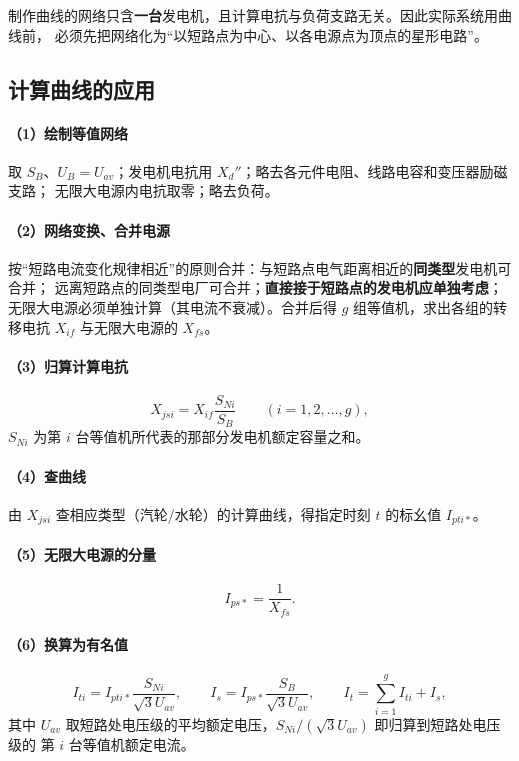 制作曲线的网络只含\textbf{一台}发电机，且计算电抗与负荷支路无关。因此实际系统用曲线前，
必须先把网络化为“以短路点为中心、以各电源点为顶点的星形电路”。

\subsection{计算曲线的应用}

\paragraph{（1）绘制等值网络}
取 $S_B$、$U_B=U_{av}$；发电机电抗用 $X_d''$；略去各元件电阻、线路电容和变压器励磁支路；
无限大电源内电抗取零；略去负荷。

\paragraph{（2）网络变换、合并电源}
按“短路电流变化规律相近”的原则合并：与短路点电气距离相近的\textbf{同类型}发电机可合并；
远离短路点的同类型电厂可合并；\textbf{直接接于短路点的发电机应单独考虑}；
无限大电源必须单独计算（其电流不衰减）。合并后得 $g$ 组等值机，求出各组的转移电抗
$X_{if}$ 与无限大电源的 $X_{fs}$。

\paragraph{（3）归算计算电抗}
\begin{equation}
  X_{jsi}=X_{if}\frac{S_{Ni}}{S_B}\qquad(i=1,2,\dots,g),
\end{equation}
$S_{Ni}$ 为第 $i$ 台等值机所代表的那部分发电机额定容量之和。

\paragraph{（4）查曲线}
由 $X_{jsi}$ 查相应类型（汽轮/水轮）的计算曲线，得指定时刻 $t$ 的标幺值 $I_{pti*}$。

\paragraph{（5）无限大电源的分量}
\begin{equation}
  I_{ps*}=\frac{1}{X_{fs}} .
\end{equation}

\paragraph{（6）换算为有名值}
\begin{equation}
  I_{ti}=I_{pti*}\frac{S_{Ni}}{\sqrt{3}U_{av}},\qquad
  I_{s}=I_{ps*}\frac{S_B}{\sqrt{3}U_{av}},\qquad
  I_t=\sum_{i=1}^{g}I_{ti}+I_s ,
\end{equation}
其中 $U_{av}$ 取短路处电压级的平均额定电压，$S_{Ni}/(\sqrt{3}U_{av})$ 即归算到短路处电压级的
第 $i$ 台等值机额定电流。

